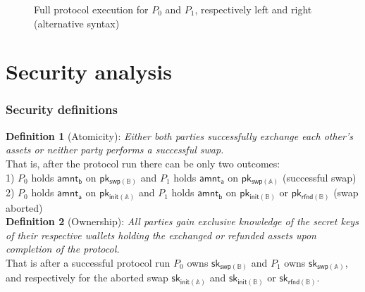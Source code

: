 \documentclass{article}      	%
\newcommand{\commentline}[2]{%
    \tikz[remember picture, overlay]{
        \node [black,anchor=west,xshift=10pt] at (#1) {#2};
    }
}
\newcommand{\blockcomment}[3]{%
    \tikz[remember picture, overlay]{
        \draw [decorate,decoration={lineto,amplitude=10pt,mirror,raise=4pt},yshift=0pt,very thick,{#3}] 
        (#1) -- (#2) node [black,midway,xshift=10pt] {};
    }
}
\begin{document}
\begin{figure}[H]
\begin{minipage}[t]{0.5\textwidth}
\begin{pchstack}[boxed]


\end{pchstack}
\end{minipage}%
\caption{Full protocol execution for $P_0$ and $P_1$, respectively left and right (alternative syntax)}
\end{figure}

\newpage

\section{Security analysis}

\subsubsection*{Security definitions}

\textbf{Definition 1} (Atomicity): \textit{Either both parties successfully exchange each other's assets or neither party performs a successful swap.}
\vspace{0.5em}
\\
That is, after the protocol run there can be only two outcomes: \\
1) $P_0$ holds $\mathsf{amnt_b}$ on $\mathsf{pk_{swp(\mathbb{B})}}$ and $P_1$ holds $\mathsf{amnt_a}$ on $\mathsf{pk_{swp(\mathbb{A})}}$ (successful swap) \\
2) $P_0$ holds $\mathsf{amnt_a}$ on $\mathsf{pk_{init(\mathbb{A})}}$ and $P_1$ holds $\mathsf{amnt_b}$ on $\mathsf{pk_{init(\mathbb{B})}}$ or $\mathsf{pk_{rfnd(\mathbb{B})}}$ (swap aborted) \\

\textbf{Definition 2} (Ownership): \textit{All parties gain exclusive knowledge of the secret keys of their respective wallets holding the exchanged or refunded assets upon completion of the protocol.} 
\vspace{0.5em}
\\
That is after a successful protocol run $P_0$ owns $\mathsf{sk_{swp(\mathbb{B})}}$ and $P_1$ owns $\mathsf{sk_{swp(\mathbb{A})}}$, and respectively for the aborted swap  $\mathsf{sk_{init(\mathbb{A})}}$ and $\mathsf{sk_{init(\mathbb{B})}}$ or $\mathsf{sk_{rfnd(\mathbb{B})}}$. \\
\end{document}
